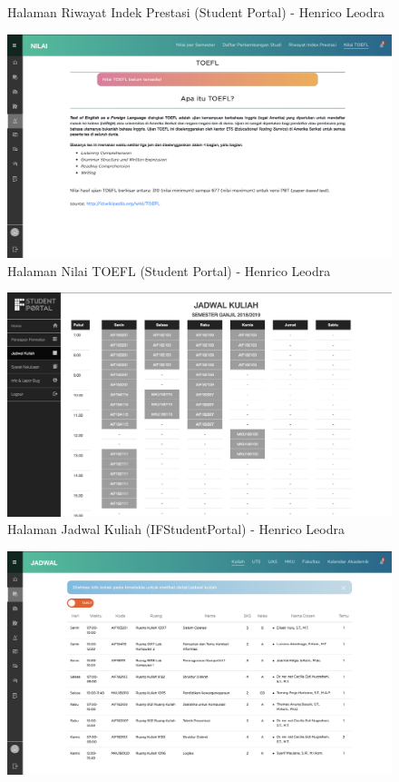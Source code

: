 \begin{itemize}
\begin{enumerate}
\begin{figure}[H]
			\caption{Halaman Riwayat Indek Prestasi (Student Portal) - Henrico Leodra}
			\label{fig:2017_2_rip_studentportal}
		\end{figure}
		\begin{figure}[H]
			\centering
			\includegraphics[scale=0.325]{Gambar/HasilPengujian/2017_2_toefl_studentportal}
			\caption{Halaman Nilai TOEFL (Student Portal) - Henrico Leodra}
			\label{fig:2017_2_toefl_studentportal}
		\end{figure}
		\begin{figure}[H]
			\centering
			\includegraphics[scale=0.325]{Gambar/HasilPengujian/2017_2_jadwal_kuliah_ifstudentportal}
			\caption{Halaman Jadwal Kuliah (IFStudentPortal) - Henrico Leodra}
			\label{fig:2017_2_jadwal_kuliah_ifstudentportal}
		\end{figure}
		\begin{figure}[H]
			\centering
			\includegraphics[scale=0.325]{Gambar/HasilPengujian/2017_2_jadwal_kuliah_studentportal}

\end{figure}
\end{enumerate}
\end{itemize}
